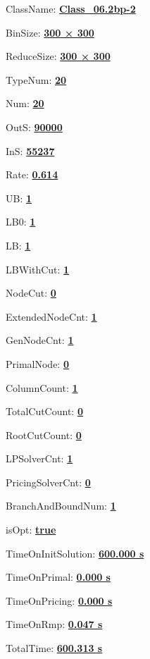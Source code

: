 \documentclass[11pt]{article}
\begin{document}
\pagestyle{empty}


ClassName: \underline{\textbf{Class_06.2bp-2}}
\par
BinSize: \underline{\textbf{300 × 300}}
\par
ReduceSize: \underline{\textbf{300 × 300}}
\par
TypeNum: \underline{\textbf{20}}
\par
Num: \underline{\textbf{20}}
\par
OutS: \underline{\textbf{90000}}
\par
InS: \underline{\textbf{55237}}
\par
Rate: \underline{\textbf{0.614}}
\par
UB: \underline{\textbf{1}}
\par
LB0: \underline{\textbf{1}}
\par
LB: \underline{\textbf{1}}
\par
LBWithCut: \underline{\textbf{1}}
\par
NodeCut: \underline{\textbf{0}}
\par
ExtendedNodeCnt: \underline{\textbf{1}}
\par
GenNodeCnt: \underline{\textbf{1}}
\par
PrimalNode: \underline{\textbf{0}}
\par
ColumnCount: \underline{\textbf{1}}
\par
TotalCutCount: \underline{\textbf{0}}
\par
RootCutCount: \underline{\textbf{0}}
\par
LPSolverCnt: \underline{\textbf{1}}
\par
PricingSolverCnt: \underline{\textbf{0}}
\par
BranchAndBoundNum: \underline{\textbf{1}}
\par
isOpt: \underline{\textbf{true}}
\par
TimeOnInitSolution: \underline{\textbf{600.000 s}}
\par
TimeOnPrimal: \underline{\textbf{0.000 s}}
\par
TimeOnPricing: \underline{\textbf{0.000 s}}
\par
TimeOnRmp: \underline{\textbf{0.047 s}}
\par
TotalTime: \underline{\textbf{600.313 s}}
\par
\newpage
\end{document}
